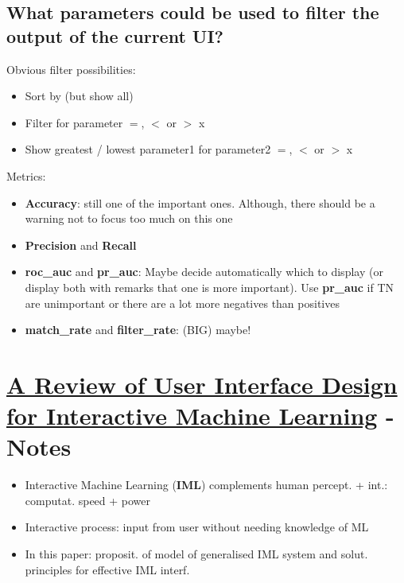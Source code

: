 \documentclass[12pt,a4paper]{article}
\begin{document}
\subsection{What parameters could be used to filter the output of the current UI?}
Obvious filter possibilities:
\begin{itemize}
\item Sort by (but show all)
\item Filter for parameter $=$, $<$ or $>$ x
\item Show greatest / lowest parameter1 for parameter2 $=$, $<$ or $>$ x
\end{itemize}
Metrics:
\begin{itemize}
\item \textbf{Accuracy}: still one of the important ones. Although, there should be a warning not to focus too much on this one
\item \textbf{Precision} and \textbf{Recall}
\item \textbf{roc\_auc} and \textbf{pr\_auc}: Maybe decide automatically which to display (or display both with remarks that one is more important). Use \textbf{pr\_auc} if TN are unimportant or there are a lot more negatives than positives
\item \textbf{match\_rate} and \textbf{filter\_rate}: (BIG) maybe!
\end{itemize}
\section{\href{https://doi.org/10.1145/3185517}{A Review of User Interface Design for Interactive Machine Learning} - Notes}
\begin{itemize}
\item Interactive Machine Learning (\textbf{IML}) complements human percept. + int.: computat. speed + power
\item Interactive process: input from user without needing knowledge of ML
\item In this paper: proposit. of model of generalised IML system and solut. principles for effective IML interf.
\end{itemize}
\end{document}
